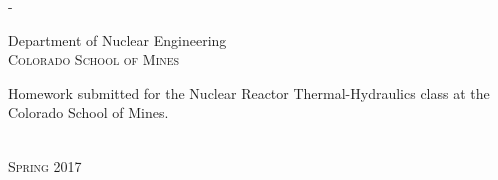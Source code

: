 \begin{titlingpage}
\begin{SingleSpace}
\begin{adjustwidth*}{\unitlength}{-\unitlength}
\begin{center}
\vspace{6mm}
{\large Department of Nuclear Engineering\\
\textsc{Colorado School of Mines}}\\
\vspace{11mm}
\begin{minipage}{10cm}
Homework submitted for the Nuclear Reactor Thermal-Hydraulics class at the Colorado School of Mines.
\end{minipage}\\
\vspace{9mm}
{\large\textsc{Spring 2017}}
\vspace{12mm}
\end{center}
\end{adjustwidth*}
\end{SingleSpace}
\end{titlingpage}
